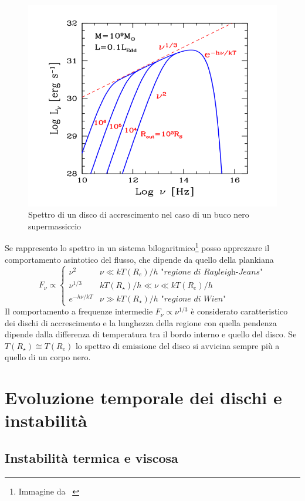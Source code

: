 \documentclass[a4paperbi]{article}
\begin{document}
	\begin{figure}[H]
		\centering
		\includegraphics[width=0.7\linewidth]{SpettroDiscoGhisellini}
		\caption{Spettro di un disco di accrescimento nel caso di un buco nero supermassiccio}
		\label{fig:SpettroDiscoGhisellini}
	\end{figure}	

	Se rappresento lo spettro in un sistema bilogaritmico\footnote{Immagine da ~\cite{GhiselliniRadiativi}} posso apprezzare il comportamento asintotico del flusso, che dipende da quello della plankiana
	\begin{equation}
		F_\nu\propto\begin{cases}
						\nu^2 & \nu\ll kT(R_{e})/h \textit{ "regione di Rayleigh-Jeans"}\\
						\nu^{1/3} & kT(R_{\star})/h\ll\nu\ll kT(R_{e})/h\\
						e^{-h\nu/kT} & \nu\gg kT(R_{\star})/h \textit{ "regione di Wien"}						
					\end{cases}
	\end{equation}
	Il comportamento a frequenze intermedie $F_\nu\propto\nu^{1/3}$ è considerato caratteristico dei dischi di accrescimento e la lunghezza della regione con quella pendenza dipende dalla differenza di temperatura tra il bordo interno e quello del disco. Se $T(R_{\star})\cong T(R_{e})$ lo spettro di emissione del disco si avvicina sempre più a quello di un corpo nero.
		
\newpage
\section{Evoluzione temporale dei dischi e instabilità}
\subsection{Instabilità termica e viscosa}
\end{document}
